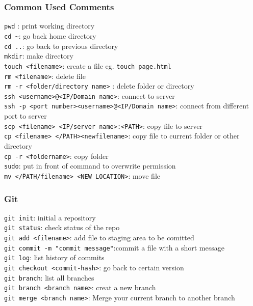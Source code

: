 \documentclass{article}
\begin{document}
\subsubsection{Common Used Comments}
\texttt{pwd} : print working directory \\
\texttt{cd \~}: go back home directory \\ 
\texttt{cd ..}: go back to previous directory \\
\texttt{mkdir}: make directory \\
\texttt{touch <filename>}: create a file eg. \texttt{touch page.html} \\
\texttt{rm <filename>}: delete file \\
\texttt{rm -r <folder/directory name>} : delete folder or directory\\
\texttt{ssh <username>@<IP/Domain name>}: connect to server \\
\texttt{ssh -p <port number><username>@<IP/Domain name>}: connect from different port to server \\
\texttt{scp <filename> <IP/server name>:<PATH>}: copy file to server \\
\texttt{cp <filename> <\~/PATH><newfilename>}: copy file to current folder or other directory \\
\texttt{cp -r <foldername>}: copy folder \\
\texttt{sudo}: put in front of command to overwrite permission \\
\texttt{mv <\~/PATH/filename> <NEW LOCATION>}: move file \\
\subsubsection{Git}
\texttt{git init}: initial a repository\\
\texttt{git status}: check status of the repo\\
\texttt{git add <filename>}: add file to staging area to be comitted \\
\texttt{git commit -m "commit message"}:commit a file with a short message\\
\texttt{git log}: list history of commits\\
\texttt{git checkout <commit-hash>}: go back to certain version\\
\texttt{git branch}: list all branches\\
\texttt{git branch <branch name>}: creat a new branch\\
\texttt{git merge <branch name>}: Merge your current branch to another branch\\
\end{document}
